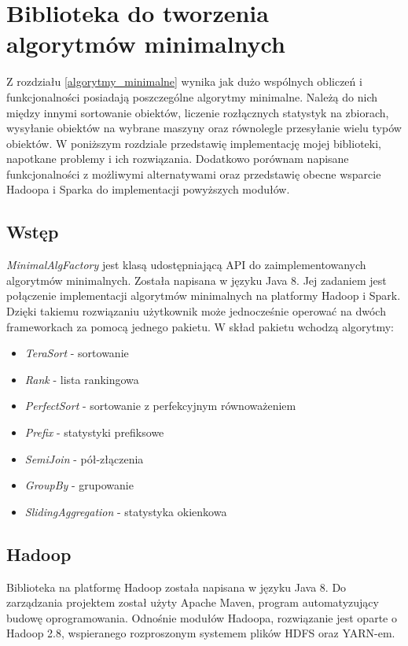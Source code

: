 \documentclass[licencjacka]{pracamgr}
\begin{document}
\chapter{Biblioteka do tworzenia algorytmów minimalnych}

Z rozdziału \ref{algorytmy_minimalne} wynika jak dużo wspólnych obliczeń i funkcjonalności posiadają poszczególne algorytmy minimalne. Należą do nich między innymi sortowanie obiektów, liczenie rozłącznych statystyk na zbiorach, wysyłanie obiektów na wybrane maszyny oraz równolegle przesyłanie wielu typów obiektów. W poniższym rozdziale przedstawię implementację mojej biblioteki, napotkane problemy i ich rozwiązania. Dodatkowo porównam napisane funkcjonalności z możliwymi alternatywami oraz przedstawię obecne wsparcie Hadoopa i Sparka do implementacji powyższych modułów.

\section{Wstęp}
\textit{MinimalAlgFactory} jest klasą udostępniającą API do zaimplementowanych algorytmów minimalnych. Została napisana w języku Java 8. Jej zadaniem jest połączenie implementacji algorytmów minimalnych na platformy Hadoop i Spark. Dzięki takiemu rozwiązaniu użytkownik może jednocześnie operować na dwóch frameworkach za pomocą jednego pakietu. W skład pakietu wchodzą algorytmy:
\begin{itemize}
    \item \textit{TeraSort} - sortowanie
    \item \textit{Rank} - lista rankingowa
    \item \textit{PerfectSort} - sortowanie z perfekcyjnym równoważeniem
    \item \textit{Prefix} - statystyki prefiksowe
    \item \textit{SemiJoin} - pół-złączenia
    \item \textit{GroupBy} - grupowanie
    \item \textit{SlidingAggregation} - statystyka okienkowa
\end{itemize}

\section{Hadoop}

Biblioteka na platformę Hadoop została napisana w języku Java 8. Do zarządzania projektem został użyty Apache Maven, program automatyzujący budowę oprogramowania. Odnośnie modułów Hadoopa, rozwiązanie jest oparte o Hadoop 2.8, wspieranego rozproszonym systemem plików HDFS oraz YARN-em.
\end{document}
